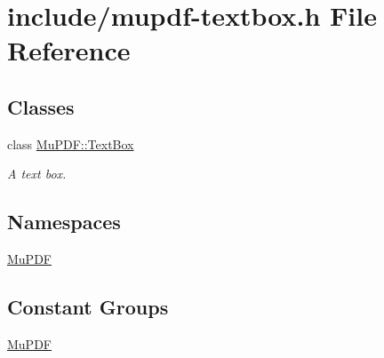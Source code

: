 \hypertarget{mupdf-textbox_8h}{\section{include/mupdf-\/textbox.h File Reference}
\label{mupdf-textbox_8h}
}
\subsection*{Classes}
\begin{DoxyCompactItemize}
\item 
class \hyperlink{class_mu_p_d_f_1_1_text_box}{Mu\-P\-D\-F\-::\-Text\-Box}
\begin{DoxyCompactList}\small\item\em A text box. \end{DoxyCompactList}\end{DoxyCompactItemize}
\subsection*{Namespaces}
\begin{DoxyCompactItemize}
\item 
\hyperlink{namespace_mu_p_d_f}{Mu\-P\-D\-F}
\end{DoxyCompactItemize}
\subsection*{Constant Groups}
\begin{DoxyCompactItemize}
\item 
\hyperlink{namespace_mu_p_d_f}{Mu\-P\-D\-F}
\end{DoxyCompactItemize}
